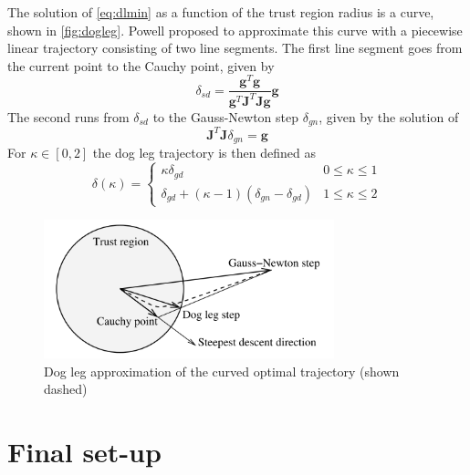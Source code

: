 The solution of \autoref{eq:dlmin} as a function of the trust region radius is a curve, shown in \autoref{fig:dogleg}. Powell \cite{powell1970hybrid} proposed to approximate this curve with a piecewise linear trajectory consisting of two line segments. The first line segment goes from the current point to the Cauchy point, given by
\begin{equation}
  \delta_{sd} = \frac{\mathbf{g}^T\mathbf{g}}{\mathbf{g}^T\mathbf{J}^T\mathbf{J}\mathbf{g}} \mathbf{g}
\end{equation}
The second runs from $\delta_{sd}$ to the Gauss-Newton step $\delta_{gn}$, given by the solution of
\begin{equation}
  \mathbf{J}^T\mathbf{J} \delta_{gn} = \mathbf{g}
\end{equation}
For $\kappa \in [0, 2]$ the dog leg trajectory is then defined as
\begin{equation}
  \delta(\kappa) = 
    \begin{cases}
      \kappa \delta_{gd} & 0 \le \kappa \le 1 \\
      \delta_{gd} + (\kappa -1)(\delta_{gn} - \delta_{gd}) & 1 \le \kappa \le 2
    \end{cases}
\end{equation}


\begin{figure}[H]
  \centering
  \includegraphics[width=0.75\textwidth]{images/dogleg}
  \caption{Dog leg approximation of the curved optimal trajectory (shown dashed)}
  \label{fig:dogleg}
\end{figure}

\section{Final set-up}
